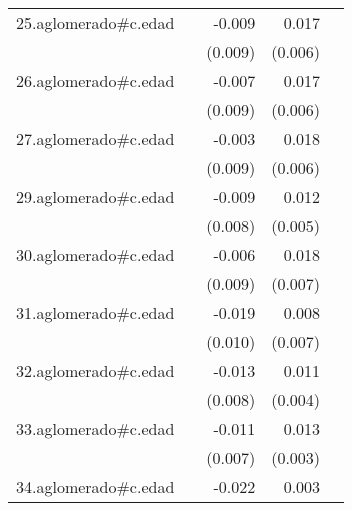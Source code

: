 {\begin{longtable}{l*{4}{D{.}{.}{-1}}}
\addlinespace
25.aglomerado#c.edad&                     &      -0.009         &       0.017\sym{**} &                     \\
            &                     &     (0.009)         &     (0.006)         &                     \\
\addlinespace
26.aglomerado#c.edad&                     &      -0.007         &       0.017\sym{**} &                     \\
            &                     &     (0.009)         &     (0.006)         &                     \\
\addlinespace
27.aglomerado#c.edad&                     &      -0.003         &       0.018\sym{**} &                     \\
            &                     &     (0.009)         &     (0.006)         &                     \\
\addlinespace
29.aglomerado#c.edad&                     &      -0.009         &       0.012\sym{*}  &                     \\
            &                     &     (0.008)         &     (0.005)         &                     \\
\addlinespace
30.aglomerado#c.edad&                     &      -0.006         &       0.018\sym{*}  &                     \\
            &                     &     (0.009)         &     (0.007)         &                     \\
\addlinespace
31.aglomerado#c.edad&                     &      -0.019         &       0.008         &                     \\
            &                     &     (0.010)         &     (0.007)         &                     \\
\addlinespace
32.aglomerado#c.edad&                     &      -0.013         &       0.011\sym{*}  &                     \\
            &                     &     (0.008)         &     (0.004)         &                     \\
\addlinespace
33.aglomerado#c.edad&                     &      -0.011         &       0.013\sym{***}&                     \\
            &                     &     (0.007)         &     (0.003)         &                     \\
\addlinespace
34.aglomerado#c.edad&                     &      -0.022\sym{*}  &       0.003         &                     \\

\end{longtable}}
